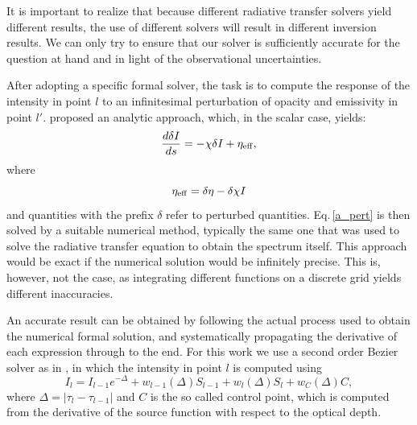 \documentclass{aa}
\begin{document}
It is important to realize that because different radiative transfer solvers yield different results, the use of different solvers will result in different inversion results. We can only try to ensure that our solver is sufficiently accurate for the question at hand and in light of the observational uncertainties.

After adopting a specific formal solver, the task is to compute the response of the intensity in point $l$ to an infinitesimal perturbation of opacity and emissivity in point $l'$. \citet{dtibook} proposed an analytic approach, which, in the scalar case, yields:
\begin{equation}
 \frac{d\delta I}{ds} = -\chi \delta I + \eta_{\rm{eff}},
 \label{a_pert}
\end{equation}
where
\begin{equation}
\eta_{\rm{eff}} = \delta \eta - \delta \chi I
\end{equation}
and quantities with the prefix $\delta$ refer to perturbed quantities. Eq.\,\ref{a_pert} is then solved by a suitable numerical method, typically the same one that was used to solve the radiative transfer equation to obtain the spectrum itself. This approach would be exact if the numerical solution would be infinitely precise. This is, however, not the case, as integrating different functions on a discrete grid yields different inaccuracies. 

An accurate result can be obtained by following the actual process used to obtain the numerical formal solution, and systematically propagating the derivative of each expression through to the end. For this work we use a second order Bezier solver as in \citet{JaimeBezier}, in which the intensity in point $l$ is computed using
\begin{equation}
 I_l = I_{l-1} e^{-\Delta} + w_{l-1}(\Delta)S_{l-1} + w_{l}(\Delta) S_l + w_C(\Delta) C,
 \label{bezier}
\end{equation}
where $\Delta=|\tau_l - \tau_{l-1}|$ and $C$ is the so called control point, which is computed from the derivative of the source function with respect to the optical depth. 
\end{document}
